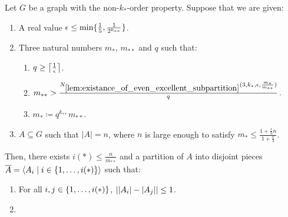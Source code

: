         \begin{lemma} \label{lem:resume_of_all_conditions_for_excellent_partitions}
            Let $G$ be a graph with the non-$k_{*}$-order property.
            Suppose that we are given:
            \begin{enumerate}[label={\Roman*}., ref={\Roman*}, font=\rmfamily]
                \item A real value $\epsilon \leq \min \{ \frac{1}{5}, \frac{1}{2^{k_{**}}} \}$.
                \item Three natural numbers $m_*$, $m_{**}$ and $q$ such that:
                    \begin{enumerate}[label=\alph*., ref=II.\alph*, font=\rmfamily]
                        \item \label{itm:resume_of_all_conditions_for_excellent_partitions.a} $q \geq \left\lceil \frac{1}{\epsilon} \right\rceil$.
                        \item \label{itm:resume_of_all_conditions_for_excellent_partitions.b}
                            $m_{**} > \frac{N_{\ref{lem:existance_of_even_excellent_subpartition}}
                                ( 3, k_*, \epsilon, \frac{m_*}{m_{**}} )}{q}$.
                        \item \label{itm:resume_of_all_conditions_for_excellent_partitions.c} $m_* \coloneqq q^{k_{**}} m_{**}$.
                \end{enumerate}
                \item \label{itm:resume_of_all_conditions_for_excellent_partitions.3}
                    $A \subseteq G$ such that $|A| = n$, where $n$ is large enough to satisfy
                    $m_* \leq \frac{1 + \frac{\epsilon}{3}n}{1 + \frac{\epsilon}{3}}$.
            \end{enumerate}
            Then, there exists $i(*) \leq \frac{n}{m_{**}}$ and a partition of $A$ into disjoint pieces
            $\overline{A} = \left< A_i \mid i \in \{ 1, \dots, i(*) \} \right>$ such that:
            \begin{enumerate}[label={\roman*}., ref={\roman*}, font=\rmfamily]
                \item \label{itm:resume_of_all_conditions_for_excellent_partitions.i}
                    For all $i, j \in \{ 1, \dots, i(*) \}$, $| | A_i |- | A_j | | \leq 1$.
                \item \label{itm:resume_of_all_conditions_for_excellent_partitions.ii}

\end{enumerate}
\end{lemma}
